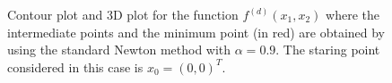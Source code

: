 \documentclass[a4paper,11pt]{article}
\begin{document}
	
	\begin{figure}[H]
		\centering
		 \quad
		\caption{Contour plot and 3D plot for the function $f^{(d)}(x_{1},x_{2})$ where the intermediate points and the minimum point (in red) are obtained by using the standard Newton method with $\alpha=0.9$. The staring point considered in this case is $x_{0}=(0,0)^{T}$.}
		\label{Fig:func_d}
	\end{figure}
	
\end{document}
